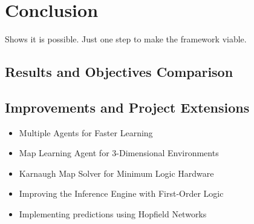 






\chapter{Conclusion} 
Shows it is possible. Just one step to make the framework viable.

\label{Conclusion}
\section{Results and Objectives Comparison}
\section{Improvements and Project Extensions}

\begin{itemize}
	\item Multiple Agents for Faster Learning
	\item Map Learning Agent for 3-Dimensional Environments
	\item Karnaugh Map Solver for Minimum Logic Hardware
	\item Improving the Inference Engine with First-Order Logic
	\item Implementing predictions using Hopfield Networks
\end{itemize}









